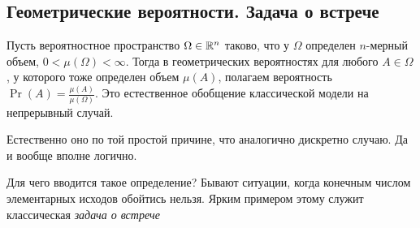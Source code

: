 \subsection{Геометрические вероятности. Задача о встрече}

\begin{definition}
    Пусть вероятностное пространство \(\Omega \in \mathbb{R}^n \) таково, что у \(\Omega\) определен \(n\)-мерный объем, \(0 < \mu(\Omega) < \infty\). Тогда в геометрических вероятностях для любого \(A \in \Omega\), у которого тоже определен объем \(\mu(A)\), полагаем вероятность \(\Pr(A) = \frac{\mu(A)}{\mu(\Omega)}\). Это естественное обобщение классической модели на непрерывный случай. 
\end{definition}
\begin{remark}
    Естественно оно по той простой причине, что аналогично дискретно случаю. Да и вообще вполне логично.
\end{remark}

Для чего вводится такое определение? Бывают ситуации, когда конечным числом элементарных исходов обойтись нельзя. Ярким примером этому служит классическая \emph{задача о встрече}

